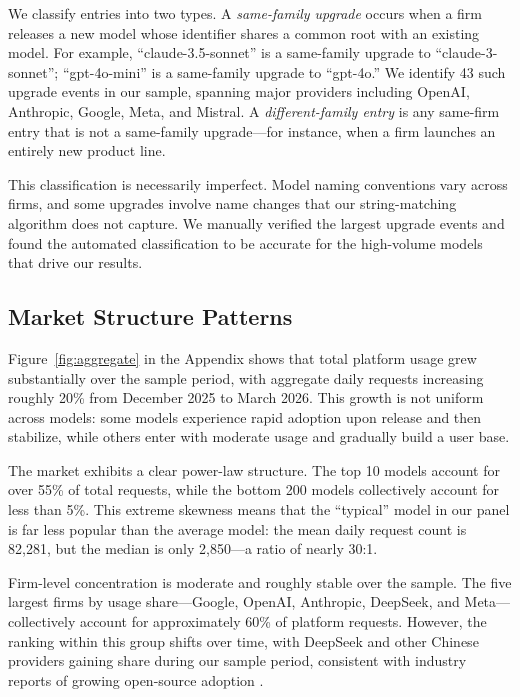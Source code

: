 \documentclass[11pt, a4paper]{article}
\begin{document}
We classify entries into two types. A \emph{same-family upgrade} occurs when a firm releases a new model whose identifier shares a common root with an existing model. For example, ``claude-3.5-sonnet'' is a same-family upgrade to ``claude-3-sonnet''; ``gpt-4o-mini'' is a same-family upgrade to ``gpt-4o.'' We identify 43 such upgrade events in our sample, spanning major providers including OpenAI, Anthropic, Google, Meta, and Mistral. A \emph{different-family entry} is any same-firm entry that is not a same-family upgrade---for instance, when a firm launches an entirely new product line.

This classification is necessarily imperfect. Model naming conventions vary across firms, and some upgrades involve name changes that our string-matching algorithm does not capture. We manually verified the largest upgrade events and found the automated classification to be accurate for the high-volume models that drive our results.

\subsection{Market Structure Patterns}

Figure~\ref{fig:aggregate} in the Appendix shows that total platform usage grew substantially over the sample period, with aggregate daily requests increasing roughly 20\% from December 2025 to March 2026. This growth is not uniform across models: some models experience rapid adoption upon release and then stabilize, while others enter with moderate usage and gradually build a user base.

The market exhibits a clear power-law structure. The top 10 models account for over 55\% of total requests, while the bottom 200 models collectively account for less than 5\%. This extreme skewness means that the ``typical'' model in our panel is far less popular than the average model: the mean daily request count is 82,281, but the median is only 2,850---a ratio of nearly 30:1.

Firm-level concentration is moderate and roughly stable over the sample. The five largest firms by usage share---Google, OpenAI, Anthropic, DeepSeek, and Meta---collectively account for approximately 60\% of platform requests. However, the ranking within this group shifts over time, with DeepSeek and other Chinese providers gaining share during our sample period, consistent with industry reports of growing open-source adoption \citep{demirer2025emerging}.
\end{document}
